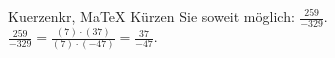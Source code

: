 \begin{MAufgabe}{Kuerzen}{kr, MaTeX}
K\"urzen Sie soweit m\"oglich: $\frac{259}{-329}$.\\ 
\ifLsg\MLoesung
\quad $\frac{259}{-329}=\frac{(7)\cdot(37)}{(7)\cdot(-47)}=\frac{37}{-47}$.\else\relax\fi
 \end{MAufgabe}